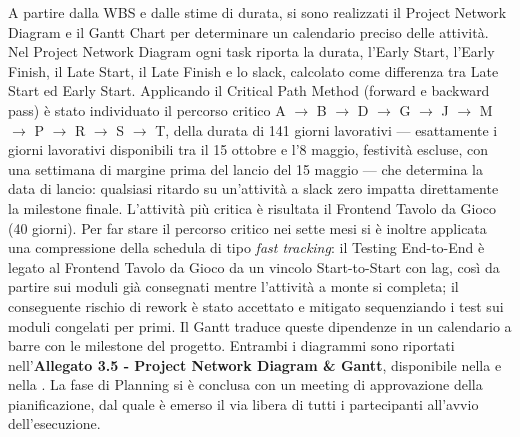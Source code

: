 A partire dalla WBS e dalle stime di durata, si sono realizzati il Project Network Diagram e il Gantt Chart per determinare un calendario preciso delle attività. Nel Project Network Diagram ogni task riporta la durata, l'Early Start, l'Early Finish, il Late Start, il Late Finish e lo slack, calcolato come differenza tra Late Start ed Early Start. Applicando il Critical Path Method (forward e backward pass) è stato individuato il percorso critico A $\to$ B $\to$ D $\to$ G $\to$ J $\to$ M $\to$ P $\to$ R $\to$ S $\to$ T, della durata di 141 giorni lavorativi --- esattamente i giorni lavorativi disponibili tra il 15 ottobre e l'8 maggio, festività escluse, con una settimana di margine prima del lancio del 15 maggio --- che determina la data di lancio: qualsiasi ritardo su un'attività a slack zero impatta direttamente la milestone finale. L'attività più critica è risultata il Frontend Tavolo da Gioco (40 giorni). Per far stare il percorso critico nei sette mesi si è inoltre applicata una compressione della schedula di tipo \textit{fast tracking}: il Testing End-to-End è legato al Frontend Tavolo da Gioco da un vincolo Start-to-Start con lag, così da partire sui moduli già consegnati mentre l'attività a monte si completa; il conseguente rischio di rework è stato accettato e mitigato sequenziando i test sui moduli congelati per primi. Il Gantt traduce queste dipendenze in un calendario a barre con le milestone del progetto. Entrambi i diagrammi sono riportati nell'\textbf{Allegato 3.5 - Project Network Diagram \& Gantt}, disponibile nella  e nella . La fase di Planning si è conclusa con un meeting di approvazione della pianificazione, dal quale è emerso il via libera di tutti i partecipanti all'avvio dell'esecuzione.
